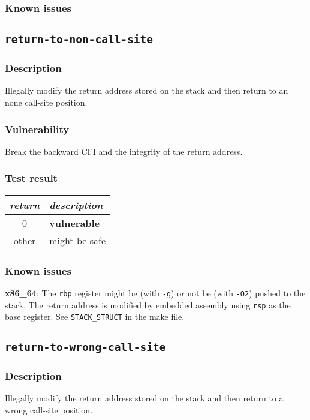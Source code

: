 \documentclass[a4paper]{book}
\begin{document}
\subsubsection{Known issues}

\newpage
\subsection{\texttt{return-to-non-call-site}}\label{test-return-to-non-call-site}

\subsubsection{Description}
Illegally modify the return address stored on the stack and then return to an none call-site position.

\subsubsection{Vulnerability}
Break the backward CFI and the integrity of the return address.

\subsubsection{Test result}
\begin{tabular}{cl}
  \toprule
  \emph{return}  & \emph{description} \\
  \midrule
  0              & \textbf{vulnerable} \\
  other          & might be safe \\
  \bottomrule
\end{tabular}
  
\subsubsection{Known issues}

\textbf{x86\_64}: The \texttt{rbp} register might be (with \texttt{-g}) or not be (with \texttt{-O2}) pushed to the stack.
The return address is modified by embedded assembly using \texttt{rsp} as the base register. See \texttt{STACK\_STRUCT} in the make file.

\newpage
\subsection{\texttt{return-to-wrong-call-site}}\label{test-return-to-wrong-call-site}

\subsubsection{Description}
Illegally modify the return address stored on the stack and then return to a wrong call-site position.
\end{document}
